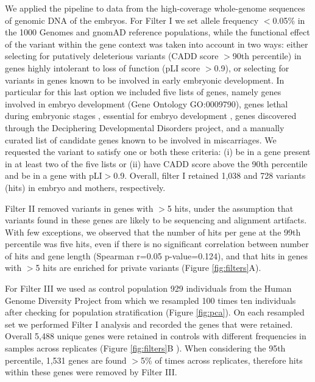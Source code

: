 We applied the \gp pipeline to data from the high-coverage whole-genome sequences of genomic DNA of the embryos. For Filter I we set allele frequency $<$0.05\% in the 1000 Genomes\cite{1000genome2015global} and gnomAD\cite{karczewski2020mutational} reference populations, while the functional effect of the variant within the gene context was taken into account in two ways: either selecting for putatively deleterious variants (CADD score $>$90th percentile) in genes highly intolerant to loss of function (pLI score $>$0.9), or selecting for variants in genes known to be involved in early embryonic development. In particular for this last option we included five lists of genes, namely genes involved in embryo development (Gene Ontology GO:0009790), genes lethal during embryonic stages \cite{dawes2019gene}, essential for embryo development \cite{dawes2019gene}, genes discovered through the Deciphering Developmental Disorders project\cite{study2015large}, and a manually curated list of candidate genes known to be involved in miscarriages. We requested the variant to satisfy one or both these criteria: (i) be in a gene present in at least two of the five lists or (ii) have CADD score above the 90th percentile and be in a gene with pLI$>$0.9. Overall, filter I retained 1,038 and 728 variants (hits) in embryo and mothers, respectively.   

Filter II removed variants in genes with $>$5 hits, under the assumption that variants found in these genes are likely to be sequencing and alignment artifacts. With few exceptions, we observed that the number of hits per gene at the 99th percentile was five hits, even if there is no significant correlation between number of hits and gene length (Spearman r=0.05 p-value=0.124), and  that hits in genes with $>$5 hits are enriched for private variants (Figure \ref{fig:filters}A).  

For Filter III we used as control population 929 individuals from the Human Genome Diversity Project\cite{bergstrom2020insights} from which we resampled 100 times ten individuals after checking for population stratification (Figure \ref{fig:pca}). On each resampled set we performed Filter I analysis and recorded the genes that were retained. Overall 5,488 unique genes were retained in controls with different frequencies in samples across replicates (Figure \ref{fig:filters}B ). When considering the 95th percentile, 1,531 genes are found $>$5\% of times across replicates, therefore hits within these genes were removed by Filter III. %

